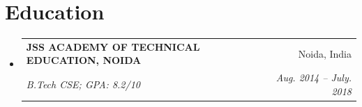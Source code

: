 \documentclass[letterpaper,11pt]{article}
\makeatletter
\newcommand{\resumeSubheading}[4]{
    \vspace{-1pt}\item
    \begin{tabular*}{0.97\textwidth}[t]{l@{\extracolsep{\fill}}r}
        \textbf{#1}       & #2                 \\
        \textit{\small#3} & \textit{\small #4} \\
    \end{tabular*}\vspace{-5pt}
}
\newcommand{\resumeSubHeadingListStart}{\begin{itemize}[leftmargin=*]}
\newcommand{\resumeSubHeadingListEnd}{\end{itemize}}
\makeatother
\begin{document}
\section{Education}
\resumeSubHeadingListStart
\resumeSubheading
{JSS ACADEMY OF TECHNICAL EDUCATION, NOIDA}{Noida, India}
{B.Tech CSE; GPA: 8.2/10}{Aug. 2014 -- July. 2018}
\resumeSubHeadingListEnd


\end{document}
